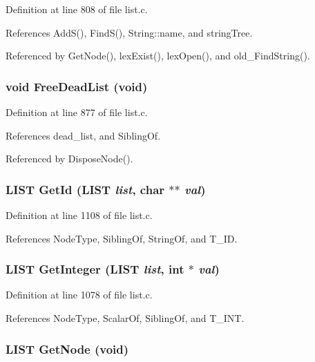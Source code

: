 Definition at line 808 of file list.c.

References Add\-S(), Find\-S(), String::name, and string\-Tree.

Referenced by Get\-Node(), lex\-Exist(), lex\-Open(), and old\_\-Find\-String().
\subsubsection{\setlength{\rightskip}{0pt plus 5cm}void Free\-Dead\-List (void)}\label{list_8c_1cd16918933d99b392a4a015c61bceab}




Definition at line 877 of file list.c.

References dead\_\-list, and Sibling\-Of.

Referenced by Dispose\-Node().
\subsubsection{\setlength{\rightskip}{0pt plus 5cm}\bf{LIST} Get\-Id (\bf{LIST} {\em list}, char $\ast$$\ast$ {\em val})}\label{list_8c_5189d4c03dfea6104c2f48b2fc5eb828}




Definition at line 1108 of file list.c.

References Node\-Type, Sibling\-Of, String\-Of, and T\_\-ID.
\subsubsection{\setlength{\rightskip}{0pt plus 5cm}\bf{LIST} Get\-Integer (\bf{LIST} {\em list}, int $\ast$ {\em val})}\label{list_8c_53c6fbf833b124ea448e957301340d90}




Definition at line 1078 of file list.c.

References Node\-Type, Scalar\-Of, Sibling\-Of, and T\_\-INT.
\subsubsection{\setlength{\rightskip}{0pt plus 5cm}\bf{LIST} Get\-Node (void)}\label{list_8c_b0c44cb8e74f854814958212aaab6408}




